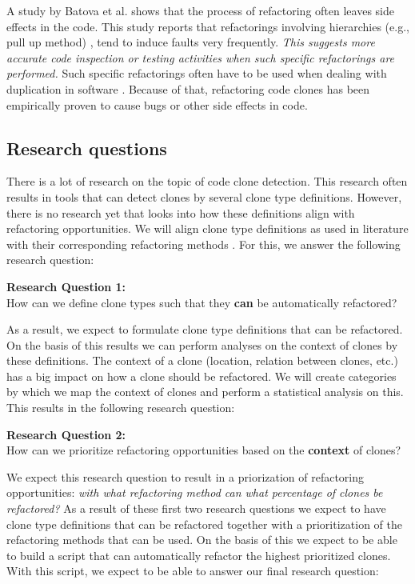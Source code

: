 A study by Batova et al. \cite{bavota2012does} shows that the process of refactoring often leaves side effects in the code. This study reports that refactorings involving hierarchies (e.g., pull up method) %
, tend to induce faults very frequently. \textit{This suggests more accurate code inspection or testing activities %
when such specific refactorings are performed.} Such specific refactorings often have to be used when dealing with duplication in software \cite{fowler2018refactoring, fontana2015duplicated}. Because of that, refactoring code clones has been empirically proven to cause bugs or other side effects in code.

\subsection{Research questions}
There is a lot of research on the topic of code clone detection. This research often results in tools that can detect clones by several clone type definitions. However, there is no research yet that looks into how these definitions align with refactoring opportunities. We will align clone type definitions as used in literature \cite{roy2007survey} with their corresponding refactoring methods \cite{fowler2018refactoring}. For this, we answer the following research question:
\begin{displayquote}
\textbf{Research Question 1:}\\How can we define clone types such that they \textbf{can} be automatically refactored?
\end{displayquote}
As a result, we expect to formulate clone type definitions that can be refactored. On the basis of this results we can perform analyses on the context of clones by these definitions. The context of a clone (location, relation between clones, etc.) has a big impact on how a clone should be refactored. We will create categories by which we map the context of clones and perform a statistical analysis on this. This results in the following research question:
\begin{displayquote}
\textbf{Research Question 2:}\\How can we prioritize refactoring opportunities based on the \textbf{context} of clones?
\end{displayquote}
We expect this research question to result in a priorization of refactoring opportunities: \textit{with what refactoring method can what percentage of clones be refactored?} As a result of these first two research questions we expect to have clone type definitions that can be refactored together with a prioritization of the refactoring methods that can be used. On the basis of this we expect to be able to build a script that can automatically refactor the highest prioritized clones. With this script, we expect to be able to answer our final research question:

